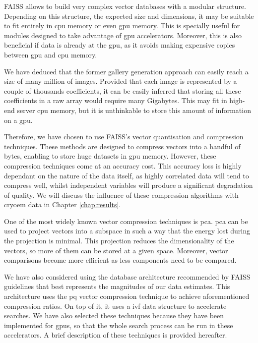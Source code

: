 \documentclass[../main.tex]{subfiles}
\begin{document}
FAISS allows to build very complex vector databases with a modular structure. Depending on this structure, the expected size and dimensions, it may be suitable to fit entirely in \gls{cpu} memory or even \gls{gpu} memory. This is specially useful for modules designed to take advantage of \gls{gpu} accelerators. Moreover, this is also beneficial if data is already at the \gls{gpu}, as it avoids making expensive copies between \gls{gpu} and \gls{cpu} memory.

We have deduced that the former gallery generation approach can easily reach a size of many million of images. Provided that each image is represented by a couple of thousands coefficients, it can be easily inferred that storing all these coefficients in a raw array would require many Gigabytes. This may fit in high-end server \gls{cpu} memory, but it is unthinkable to store this amount of information on a \gls{gpu}.

Therefore, we have chosen to use FAISS's vector quantisation and compression techniques. These methods are designed to compress vectors into a handful of bytes, enabling to store huge datasets in \gls{gpu} memory. However, these compression techniques come at an accuracy cost. This accuracy loss is highly dependant on the nature of the data itself, as highly correlated data will tend to compress well, whilst independent variables will produce a significant degradation of quality. We will discuss the influence of these compression algorithms with \gls{cryoem} data in Chapter \ref{chap:results}.

One of the most widely known vector compression techniques is \gls{pca}. \Gls{pca} can be used to project vectors into a subspace in such a way that the energy lost during the projection is minimal. This projection reduces the dimensionality of the vectors, so more of them can be stored at a given space. Moreover, vector comparisons become more efficient as less components need to be compared.

We have also considered using the database architecture recommended by FAISS guidelines\cite{johnson2019} that best represents the magnitudes of our data estimates. This architecture uses the \gls{pq} vector compression technique to achieve aforementioned compression ratios. On top of it, it uses a \gls{ivf} data structure to accelerate searches. We have also selected these techniques because they have been implemented for \glspl{gpu}, so that the whole search process can be run in these accelerators. A brief description of these techniques is provided hereafter.
\end{document}
